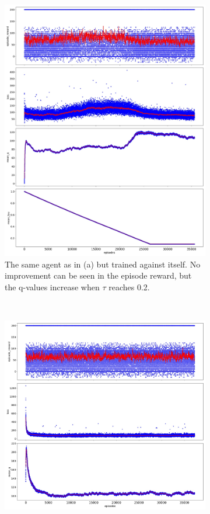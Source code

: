 \begin{figure}[hb]
\begin{center}
        \begin{subfigure}[h]{.4\textwidth}\includegraphics[width=\textwidth]{images/DQNAgent2L_56x5_2_sep_learning_2017-05-27_20-01-57_steps_1000000_tau}
            \caption{The same agent as in (a) but trained against itself. No improvement can be seen in the episode reward, but the q-values increase when $\tau$ reaches 0.2.}
        \end{subfigure}~
        \begin{subfigure}[h]{.48\textwidth}\includegraphics[width=\textwidth]{images/DQNAgent2L_56x5_2_sep_learning_2017-06-06_17-12-32_steps_1000000}

\end{subfigure}
\end{center}
\end{figure}

